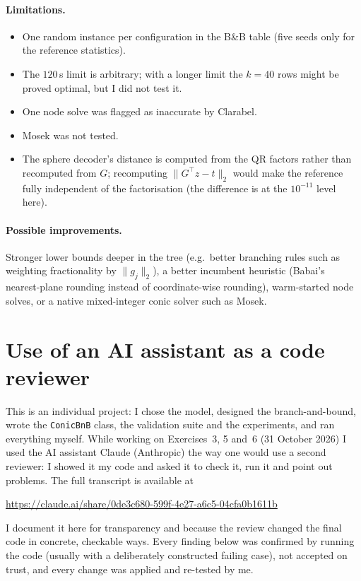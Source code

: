 \documentclass[11pt,a4paper]{article}
\newcommand{\norm}[1]{\lVert #1\rVert_2}
\newcommand{\BB}{B\&B}
\begin{document}
\paragraph{Limitations.}
\begin{itemize}
  \item One random instance per configuration in the \BB{} table (five seeds only for the reference statistics).
  \item The $120$\,s limit is arbitrary; with a longer limit the $k=40$ rows might be proved optimal, but I did not test it.
  \item One node solve was flagged as inaccurate by Clarabel.
  \item Mosek was not tested.
  \item The sphere decoder's distance is computed from the QR factors rather than recomputed from $G$; recomputing $\norm{G^\top z-t}$ would make the reference fully independent of the factorisation (the difference is at the $10^{-11}$ level here).
\end{itemize}

\paragraph{Possible improvements.} Stronger lower bounds deeper in the tree (e.g.\ better branching rules such as weighting fractionality by $\norm{g_j}$), a better incumbent heuristic (Babai's nearest-plane rounding instead of coordinate-wise rounding), warm-started node solves, or a native mixed-integer conic solver such as Mosek.

\appendix
\section{Use of an AI assistant as a code reviewer}\label{app:chat}

This is an individual project: I chose the model, designed the branch-and-bound, wrote the \texttt{ConicBnB} class, the validation suite and the experiments, and ran everything myself. While working on Exercises~3, 5 and~6 (31 October 2026) I used the AI assistant Claude (Anthropic) the way one would use a second reviewer: I showed it my code and asked it to check it, run it and point out problems. The full transcript is available at
\begin{center}
\url{https://claude.ai/share/0de3c680-599f-4e27-a6c5-04cfa0b1611b}
\end{center}
I document it here for transparency and because the review changed the final code in concrete, checkable ways. Every finding below was confirmed by running the code (usually with a deliberately constructed failing case), not accepted on trust, and every change was applied and re-tested by me.
\end{document}
